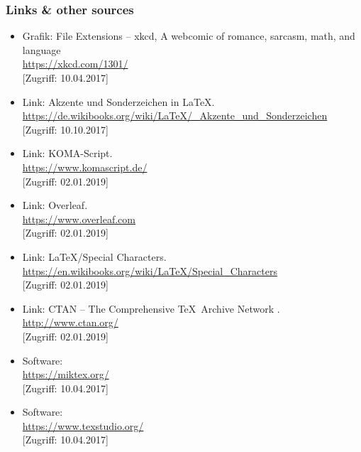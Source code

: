 \documentclass[a4paper,10pt,handout]{beamer}
\begin{document}
\begin{frame}[allowframebreaks]
\frametitle{Links \& other sources}

{\footnotesize
	
	\begin{itemize}
		
		\item Grafik: File Extensions -- xkcd, A webcomic of romance, sarcasm, math, and language\\
		\url{https://xkcd.com/1301/} \\
		{[}Zugriff: 10.04.2017]
		
		\item Link: Akzente und Sonderzeichen in \LaTeX .\\
		\url{https://de.wikibooks.org/wiki/LaTeX/_Akzente_und_Sonderzeichen}\\
		{[}Zugriff: 10.10.2017]

		\item Link: KOMA-Script.\\
		\url{https://www.komascript.de/}\\
		{[}Zugriff: 02.01.2019]

		\item Link: Overleaf.\\
		\url{https://www.overleaf.com}\\
		{[}Zugriff: 02.01.2019]
		
		\item Link: \LaTeX /Special Characters.\\
		\url{https://en.wikibooks.org/wiki/LaTeX/Special_Characters}\\
		{[}Zugriff: 02.01.2019]
		
		\item Link: CTAN -- The Comprehensive \TeX\ Archive Network .\\
		\url{http://www.ctan.org/}\\
		{[}Zugriff: 02.01.2019]

		\item Software: \\
		\url{https://miktex.org/} \\
		{[}Zugriff: 10.04.2017]
		
		\item Software: \\
		\url{https://www.texstudio.org/} \\
		{[}Zugriff: 10.04.2017]
		

\end{itemize}}
\end{frame}
\end{document}
